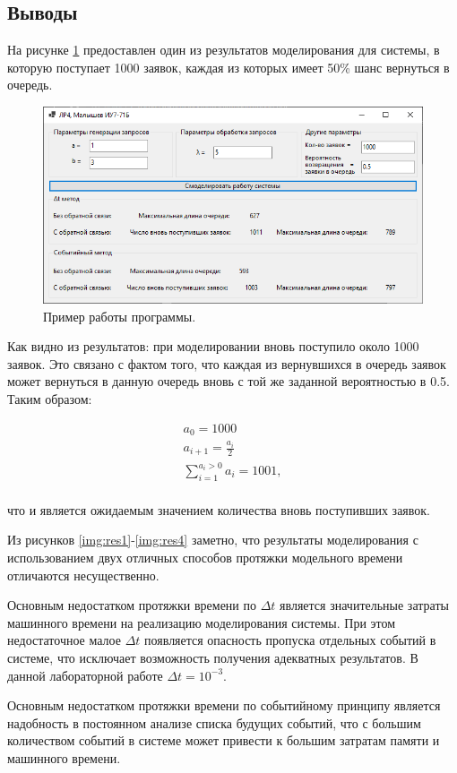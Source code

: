 \documentclass[14pt]{extreport}
\begin{document}
\subsection*{Выводы}

На рисунке \ref{img:res5} предоставлен один из результатов моделирования для системы, в которую поступает 1000 заявок, каждая из которых имеет 50\% шанс вернуться в очередь.

\begin{figure}[H]
	\begin{center}
		\includegraphics[scale=0.8]{imgs/res5.png}
	\end{center}
	\caption{Пример работы программы.}
	\label{img:res5}
\end{figure}

Как видно из результатов: при моделировании вновь поступило около 1000 заявок. Это связано с фактом того, что каждая из вернувшихся в очередь заявок может вернуться в данную очередь вновь с той же заданной вероятностью в 0.5. Таким образом:

\begin{equation}
	\begin{split}
		a_0 = 1000 \\
		a_{i+1} = \frac{a_i}{2} \\
		\sum_{i = 1}^{a_i > 0} a_i = 1001, \\
	\end{split}
\end{equation}

что и является ожидаемым значением количества вновь поступивших заявок.

Из рисунков \ref{img:res1}-\ref{img:res4} заметно, что результаты моделирования с использованием двух отличных способов протяжки модельного времени отличаются несущественно.

Основным недостатком протяжки времени по $\Delta t$ является значительные затраты машинного времени на реализацию моделирования системы. При этом недостаточное малое $\Delta t$ появляется опасность пропуска отдельных событий в системе, что исключает возможность получения адекватных результатов. В данной лабораторной работе $\Delta t = 10^{-3}$.

Основным недостатком протяжки времени по событийному принципу является надобность в постоянном анализе списка будущих событий, что с большим количеством событий в системе может привести к большим затратам памяти и машинного времени.
\end{document}
